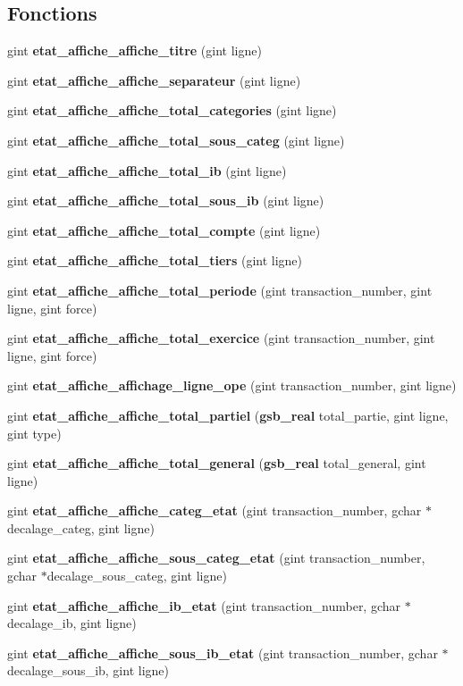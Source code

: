 \subsection*{Fonctions}
\begin{DoxyCompactItemize}
\item 
gint {\bf etat\_\-affiche\_\-affiche\_\-titre} (gint ligne)
\item 
gint {\bf etat\_\-affiche\_\-affiche\_\-separateur} (gint ligne)
\item 
gint {\bf etat\_\-affiche\_\-affiche\_\-total\_\-categories} (gint ligne)
\item 
gint {\bf etat\_\-affiche\_\-affiche\_\-total\_\-sous\_\-categ} (gint ligne)
\item 
gint {\bf etat\_\-affiche\_\-affiche\_\-total\_\-ib} (gint ligne)
\item 
gint {\bf etat\_\-affiche\_\-affiche\_\-total\_\-sous\_\-ib} (gint ligne)
\item 
gint {\bf etat\_\-affiche\_\-affiche\_\-total\_\-compte} (gint ligne)
\item 
gint {\bf etat\_\-affiche\_\-affiche\_\-total\_\-tiers} (gint ligne)
\item 
gint {\bf etat\_\-affiche\_\-affiche\_\-total\_\-periode} (gint transaction\_\-number, gint ligne, gint force)
\item 
gint {\bf etat\_\-affiche\_\-affiche\_\-total\_\-exercice} (gint transaction\_\-number, gint ligne, gint force)
\item 
gint {\bf etat\_\-affiche\_\-affichage\_\-ligne\_\-ope} (gint transaction\_\-number, gint ligne)
\item 
gint {\bf etat\_\-affiche\_\-affiche\_\-total\_\-partiel} ({\bf gsb\_\-real} total\_\-partie, gint ligne, gint type)
\item 
gint {\bf etat\_\-affiche\_\-affiche\_\-total\_\-general} ({\bf gsb\_\-real} total\_\-general, gint ligne)
\item 
gint {\bf etat\_\-affiche\_\-affiche\_\-categ\_\-etat} (gint transaction\_\-number, gchar $\ast$decalage\_\-categ, gint ligne)
\item 
gint {\bf etat\_\-affiche\_\-affiche\_\-sous\_\-categ\_\-etat} (gint transaction\_\-number, gchar $\ast$decalage\_\-sous\_\-categ, gint ligne)
\item 
gint {\bf etat\_\-affiche\_\-affiche\_\-ib\_\-etat} (gint transaction\_\-number, gchar $\ast$decalage\_\-ib, gint ligne)
\item 
gint {\bf etat\_\-affiche\_\-affiche\_\-sous\_\-ib\_\-etat} (gint transaction\_\-number, gchar $\ast$decalage\_\-sous\_\-ib, gint ligne)

\end{DoxyCompactItemize}
